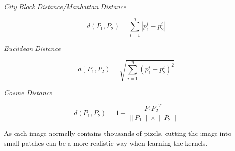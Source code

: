 \begin{flushleft}
\emph{City Block Distance/Manhattan Distance}
\end{flushleft}
\begin{equation}
  d({P_1},{P_2}) = \sum\limits_{i = 1}^n {\left| {p_1^i - p_2^i} \right|}
\end{equation}

\begin{flushleft}
\emph{Euclidean Distance}
\end{flushleft}
\begin{equation}
  d({P_1},{P_2}) = \sqrt {\sum\limits_{i = 1}^n {{{\left( {p_1^i - p_2^i} \right)}^2}} }
\end{equation}

\begin{flushleft}
\emph{Cosine Distance}
\end{flushleft}
\begin{equation}
  d({P_1},{P_2}) = 1 - \frac{{{P_1}{P_2}^T}}{{\left\| {{P_1}} \right\|\times\left\| {{P_2}} \right\|}}
\end{equation}

As each image normally contains thousands of pixels, cutting the image into small patches can be a more realistic way when learning the kernels. 